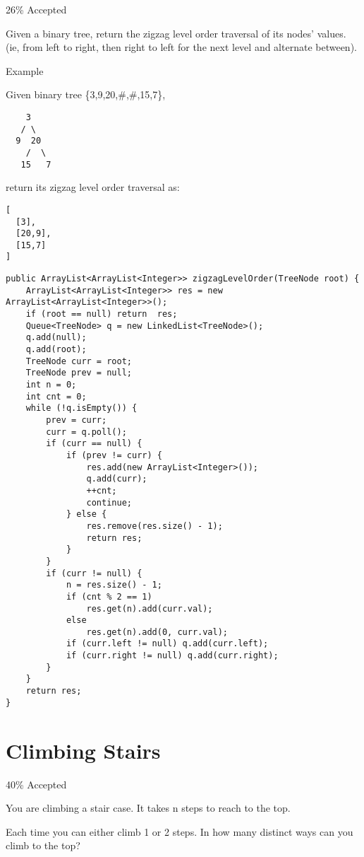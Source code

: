 \documentclass[9pt, b5paaper]{book}
\begin{document}
26\% Accepted

Given a binary tree, return the zigzag level order traversal of its nodes' values. (ie, from left to right, then right to left for the next level and alternate between).

Example

Given binary tree \{3,9,20,\#,\#,15,7\},
\begin{verbatim}
    3
   / \
  9  20
    /  \
   15   7
\end{verbatim}

return its zigzag level order traversal as:
\begin{verbatim}
[
  [3],
  [20,9],
  [15,7]
]
\end{verbatim}
\begin{verbatim}
public ArrayList<ArrayList<Integer>> zigzagLevelOrder(TreeNode root) {
    ArrayList<ArrayList<Integer>> res = new ArrayList<ArrayList<Integer>>();
    if (root == null) return  res;
    Queue<TreeNode> q = new LinkedList<TreeNode>();
    q.add(null);
    q.add(root);
    TreeNode curr = root;
    TreeNode prev = null;
    int n = 0;
    int cnt = 0;
    while (!q.isEmpty()) {
        prev = curr;
        curr = q.poll();
        if (curr == null) {
            if (prev != curr) {
                res.add(new ArrayList<Integer>());
                q.add(curr);
                ++cnt;
                continue;
            } else {
                res.remove(res.size() - 1);
                return res;   
            }
        }
        if (curr != null) {
            n = res.size() - 1;
            if (cnt % 2 == 1)
                res.get(n).add(curr.val);
            else
                res.get(n).add(0, curr.val);
            if (curr.left != null) q.add(curr.left);
            if (curr.right != null) q.add(curr.right);
        }
    }
    return res;
}
\end{verbatim}
\section{Climbing Stairs}
\label{sec-5-21}

40\% Accepted

You are climbing a stair case. It takes n steps to reach to the top.

Each time you can either climb 1 or 2 steps. In how many distinct ways can you climb to the top?
\end{document}
